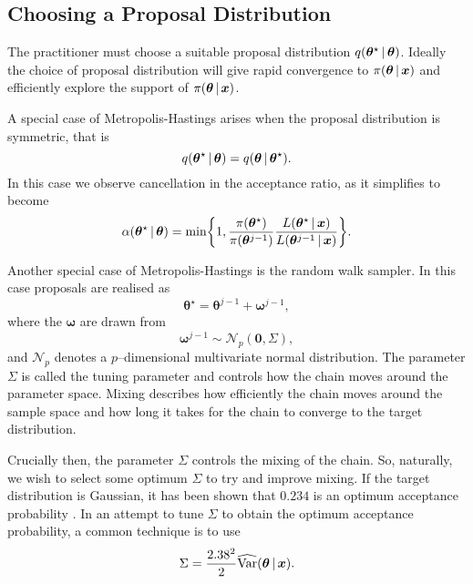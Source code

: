 \subsection{Choosing a Proposal Distribution}
\label{ssec:proposal_distribution}
The practitioner must choose a suitable proposal distribution $q(\bm{\theta}^\star \,|\, \bm{\theta})$. Ideally the choice of proposal distribution will give rapid convergence to $\pi(\bm{\theta} \,|\, \bm{x})$ and efficiently explore the support of $\pi(\bm{\theta} \,|\, \bm{x})$.

A special case of Metropolis-Hastings arises when the proposal distribution is symmetric, that is
\begin{equation*}
	q(\bm{\theta}^\star \,|\, \bm{\theta}) = q(\bm{\theta} \,|\, \bm{\theta}^\star).
\end{equation*}
In this case we observe cancellation in the acceptance ratio, as it simplifies to become 
\begin{equation*}
	\alpha({\bm{\theta}}^\star \,|\, \bm{\theta}) = \text{min}\bigg\{ 1, \frac{\pi({\bm{\theta}}^\star)}{\pi({\bm{\theta}}^{j-1})} \frac{L(\bm{\theta}^\star \,|\, \bm{x})}{L({\bm{\theta}}^{j-1} \,|\, \bm{x})} \bigg\}.
\end{equation*}

Another special case of Metropolis-Hastings is the random walk sampler. In this case proposals are realised as
\begin{equation*}
	\bm{\theta}^\star = \bm{\theta}^{j-1} + \bm{\omega}^{j-1},
\end{equation*}
where the $\bm{\omega}$ are drawn from
\begin{equation*}
	\bm{\omega}^{j-1} \sim \mathcal{N}_p(\bm{0}, \Sigma),
\end{equation*}
and $\mathcal{N}_p$ denotes a $p$--dimensional multivariate normal distribution. The parameter $\Sigma$ is called the tuning parameter and controls how the chain moves around the parameter space. Mixing describes how efficiently the chain moves around the sample space and how long it takes for the chain to converge to the target distribution.

Crucially then, the parameter $\Sigma$ controls the mixing of the chain. So, naturally, we wish to select some optimum $\Sigma$ to try and improve mixing. If the target distribution is Gaussian, it has been shown that $0.234$ is an optimum acceptance probability \citep{roberts01}. In an attempt to tune $\Sigma$ to obtain the optimum acceptance probability, a common technique is to use 
\begin{equation*}
	\Sigma = \frac{2.38^2}{2} \widehat{\text{Var}}(\bm{\theta} \,|\, \bm{x}).
\end{equation*}


